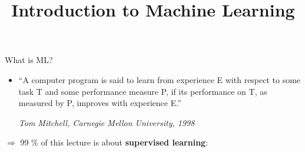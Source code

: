 \documentclass[11pt,compress,t,notes=noshow, xcolor=table]{beamer}
\title{Introduction to Machine Learning}
\date{}
\begin{document}
\sloppy


\begin{vbframe}{What is ML?}
\begin{itemize}
    \item
    ``A computer program is said to learn from experience E with respect to
  some task T and some performance measure P, if its performance on T, as
  measured by P, improves with experience E.''\\
  \begin{footnotesize}
  \emph{Tom Mitchell, Carnegie Mellon University, 1998}\\
  \end{footnotesize}
\end{itemize}

\vspace{1ex}

$\Rightarrow$ 99 $\%$ of this lecture is about \textbf{supervised learning}:


\end{vbframe}
\end{document}
